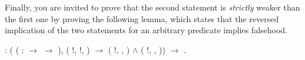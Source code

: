 \begin{exercise}
\coqdocemptyline


Finally, you are invited to prove that the second statement is
\textit{strictly} weaker than the first one by proving the following lemma,
which states that the reversed implication of the two statements for
an arbitrary predicate  implies falsehood.


\begin{coqdoccode}
\coqdocemptyline
\coqdocnoindent
{}  : \coqdoceol
\coqdocindent{1.00em}
(\coqdockw{\ensuremath{\forall}}  ( :  \ensuremath{\rightarrow}  \ensuremath{\rightarrow} ),\coqdoceol
\coqdocindent{1.50em}
(\coqdoctac{\ensuremath{\exists}} !, \coqdoctac{\ensuremath{\exists}} !,   ) \ensuremath{\rightarrow}\coqdoceol
\coqdocindent{1.50em}
(\coqdoctac{\ensuremath{\exists}} !, \coqdoctac{\ensuremath{\exists}} ,   ) \ensuremath{\land} (\coqdoctac{\ensuremath{\exists}} !, \coqdoctac{\ensuremath{\exists}} ,   )) \ensuremath{\rightarrow}\coqdoceol
\coqdocindent{1.00em}
.\coqdoceol
\coqdocemptyline
\coqdocemptyline
\end{coqdoccode}
\end{exercise}
\begin{coqdoccode}
\coqdocemptyline
\end{coqdoccode}
